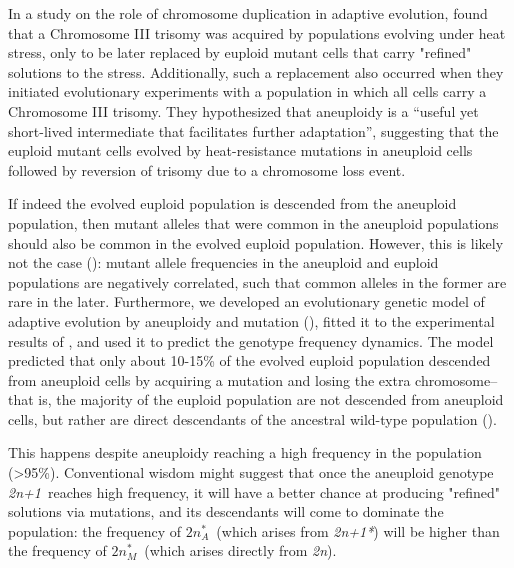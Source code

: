 \documentclass[12pt]{extarticle}
\newcommand{\euwt}{\emph{2n}}
\newcommand{\anwt}{\emph{2n+1}}
\newcommand{\eumtM}{\emph{$2n^*_M$}}
\newcommand{\eumtA}{\emph{$2n^*_A$}}
\newcommand{\anmt}{\emph{2n+1*}}
\begin{document}
In a study on the role of chromosome duplication in adaptive evolution, 
\citet{Yona2012} found that a Chromosome III trisomy was acquired by \yeast populations evolving under heat stress, only to be later replaced by euploid mutant cells that carry "refined" solutions to the stress. 
Additionally, such a replacement also occurred when they initiated evolutionary experiments with a population in which all cells carry a Chromosome III trisomy.
They hypothesized that aneuploidy is a ``useful yet short-lived intermediate that facilitates further adaptation'', suggesting that the euploid mutant cells evolved by heat-resistance mutations in aneuploid cells followed by reversion of trisomy due to a chromosome loss event. 

If indeed the evolved euploid population is descended from the aneuploid population, then mutant alleles that were common in the aneuploid populations should also be common in the evolved euploid population.
However, this is likely not the case (): mutant allele frequencies in the aneuploid and euploid populations are negatively correlated, such that common alleles in the former are rare in the later. 
Furthermore, we developed an evolutionary genetic model of adaptive evolution by aneuploidy and mutation (), fitted it to the experimental results of \citet{Yona2012}, and used it to predict the genotype frequency dynamics.
The model predicted that only about 10-15\% of the evolved euploid population descended from aneuploid cells by acquiring a mutation and losing the extra chromosome--that is, the majority of the euploid population are not descended from aneuploid cells, but rather are direct descendants of the ancestral wild-type population ().

This happens despite aneuploidy reaching a high frequency in the population (>95\%). 
Conventional wisdom might suggest that once the aneuploid genotype \anwt\ reaches high frequency, it will have a better chance at producing "refined" solutions via mutations, and its descendants will come to dominate the population: the frequency of \eumtA\ (which arises from \anmt) will be higher than the frequency of \eumtM\ (which arises directly from \euwt).
\end{document}
